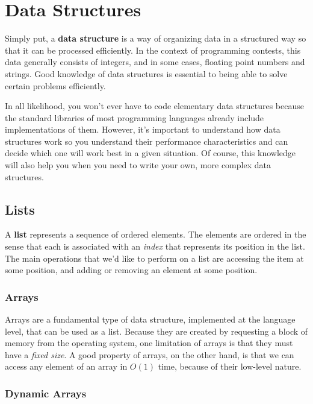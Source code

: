 \chapter{Data Structures}

Simply put, a \textbf{data structure} is a way of organizing data in a structured way so that it can be processed efficiently. In the context of programming contests, this data generally consists of integers, and in some cases, floating point numbers and strings. Good knowledge of data structures is essential to being able to solve certain problems efficiently.

In all likelihood, you won't ever have to code elementary data structures because the standard libraries of most programming languages already include implementations of them. However, it's important to understand how data structures work so you understand their performance characteristics and can decide which one will work best in a given situation. Of course, this knowledge will also help you when you need to write your own, more complex data structures.



\section{Lists}

A \textbf{list} represents a sequence of ordered elements. The elements are ordered in the sense that each is associated with an \textit{index} that represents its position in the list. The main operations that we'd like to perform on a list are accessing the item at some position, and adding or removing an element at some position.


\subsection{Arrays}

Arrays are a fundamental type of data structure, implemented at the language level, that can be used as a list. Because they are created by requesting a block of memory from the operating system, one limitation of arrays is that they must have a \textit{fixed size}. A good property of arrays, on the other hand, is that we can access any element of an array in $O(1)$ time, because of their low-level nature.

\subsection{Dynamic Arrays}

